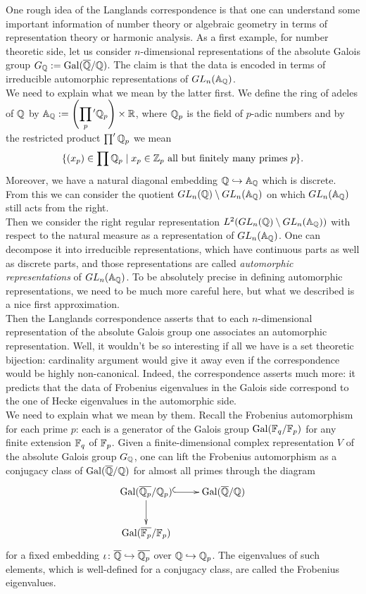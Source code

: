 One rough idea of the Langlands correspondence is that one can understand some important information of number theory or algebraic geometry in terms of representation theory or harmonic analysis. As a first example, for number theoretic side, let us consider $n$-dimensional representations of the absolute Galois group $G_{\mathbb{Q}}:= \mathrm{Gal}(\overline{\mathbb{Q}}/\mathbb{Q})$. The claim is that the data is encoded in terms of irreducible automorphic representations of $GL_n(\mathbb{A}_{\mathbb{Q}})$.\\

We need to explain what we mean by the latter first. We define the ring of adeles of $\mathbb{Q}$ by $\mathbb{A}_{\mathbb{Q}} := \left(\displaystyle\prod_p\;\!\! ' \mathbb{Q}_p\right) \times \mathbb{R}$, where $\mathbb{Q}_p$ is the field of $p$-adic numbers and by the restricted product $\prod' \mathbb{Q}_p$ we mean \[\{(x_p) \in \prod \mathbb{Q}_p  \mid x_p\in\mathbb{Z}_p \text{ all but finitely many primes }p \}.\] Moreover, we have a natural diagonal embedding $\mathbb{Q} \hookrightarrow \mathbb{A}_{\mathbb{Q}}$ which is discrete. From this we can consider the quotient $GL_n(\mathbb{Q}) \setminus GL_n(\mathbb{A}_{\mathbb{Q}})$ on which $GL_n(\mathbb{A}_{\mathbb{Q}})$ still acts from the right.\\

Then we consider the right regular representation $L^2(GL_n(\mathbb{Q}) \setminus GL_n(\mathbb{A}_{\mathbb{Q}}) )$ with respect to the natural measure as a representation of $GL_n(\mathbb{A}_{\mathbb{Q}})$. One can decompose it into irreducible representations, which have continuous parts as well as discrete parts, and those representations are called \textit{automorphic representations} of $GL_n(\mathbb{A}_{\mathbb{Q}})$. To be absolutely precise in defining automorphic representations, we need to be much more careful here, but what we described is a nice first approximation.\\

Then the Langlands correspondence asserts that to each $n$-dimensional representation of the absolute Galois group one associates an automorphic representation. Well, it wouldn't be so interesting if all we have is a set theoretic bijection: cardinality argument would give it away even if the correspondence would be highly non-canonical. Indeed, the correspondence asserts much more: it predicts that the data of Frobenius eigenvalues in the Galois side correspond to the one of Hecke eigenvalues in the automorphic side.\\

We need to explain what we mean by them. Recall the Frobenius automorphism for each prime $p$: each is a generator of the Galois group $\mathrm{Gal}(\mathbb{F}_q/ \mathbb{F}_p )$ for any finite extension $\mathbb{F}_q$ of $\mathbb{F}_p$. Given a finite-dimensional complex representation $V$ of the absolute Galois group $G_{\mathbb{Q}}$, one can lift the Frobenius automorphism as a conjugacy class of $\mathrm{Gal}(\overline{\mathbb{Q}}/\mathbb{Q})$ for almost all primes through the diagram \[
\xymatrix{
\mr{Gal}(\overline{\qQ_p}/  \qQ_p) \ar[d] \ar@{^(->}[r] & \mr{Gal}(\overline{\qQ}/\qQ) \\
\mr{Gal}(\overline{\fF_p} /  \fF_p)
}
\] for a fixed embedding $\iota \colon \overline{\mathbb{Q}}\hookrightarrow \overline{\mathbb{Q}_p}$ over $\mathbb{Q} \hookrightarrow \mathbb{Q}_p$. The eigenvalues of such elements, which is well-defined for a conjugacy class, are called the Frobenius eigenvalues.\\

